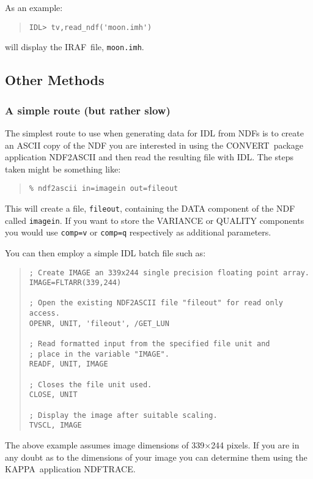 \documentclass[twoside,11pt]{article}
\newcommand{\htmladdnormallink}[2]{#1}
\newcommand{\htmlref}[2]{#1}
\newcommand{\xref}[3]{#1}
\newcommand{\CONVERT}{{\footnotesize CONVERT}}
\newcommand{\IRAF}{{\footnotesize IRAF}}
\newcommand{\IRAFURL}{http://star-www.rl.ac.uk/iraf/web/iraf-homepage.html}
\newcommand{\IRAFref}{\htmladdnormallink{\IRAF}{\IRAFURL}}
\newcommand{\KAPPA}{{\footnotesize KAPPA}}
\begin{document}
As an example:
\begin{quote} \begin{verbatim}
IDL> tv,read_ndf('moon.imh')
\end{verbatim} \end{quote}
will display the \IRAFref\ file, \texttt{moon.imh}.

\subsection{Other Methods}
\subsubsection{A simple route (but rather slow)}
The simplest route to use when generating data for IDL from NDFs is
to create an ASCII copy of the NDF you are interested in
using the \CONVERT\ package application 
\htmlref{NDF2ASCII}{NDF2ASCII} and then read 
the resulting file with IDL. The steps taken might be something like:

\begin{quote} \begin{verbatim}
% ndf2ascii in=imagein out=fileout  
\end{verbatim} \end{quote}
This will create a file, \texttt{fileout}, containing the DATA component 
of the NDF called \texttt{imagein}. If you want to store the VARIANCE or 
QUALITY components you would use \texttt{comp=v} or \texttt{comp=q} respectively
as additional parameters.

You can then employ a simple IDL batch file such as:
\begin{quote} \begin{verbatim}
; Create IMAGE an 339x244 single precision floating point array.
IMAGE=FLTARR(339,244)

; Open the existing NDF2ASCII file "fileout" for read only access. 
OPENR, UNIT, 'fileout', /GET_LUN
  
; Read formatted input from the specified file unit and 
; place in the variable "IMAGE".
READF, UNIT, IMAGE
 
; Closes the file unit used.
CLOSE, UNIT

; Display the image after suitable scaling. 
TVSCL, IMAGE
\end{verbatim} \end{quote} 
The above example assumes image dimensions of 339$\times$244 pixels. 
If you are in any doubt as to the dimensions of your image you can
determine them using the \KAPPA\ application 
\xref{NDFTRACE}{sun95}{NDFTRACE}. 
\end{document}
